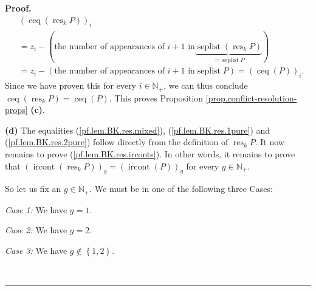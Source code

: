 \documentclass[numbers=enddot,12pt,final,onecolumn,notitlepage]{scrartcl}%
\theoremstyle{definition}
\newenvironment{proof}[1][Proof]{\noindent\textbf{#1.} }{\ \rule{0.5em}{0.5em}}
\begin{document}
\begin{proof}
\begin{align*}
&  \left(  \operatorname*{ceq}\left(  \operatorname*{res}\nolimits_{k}%
P\right)  \right)  _{i}\\
&  =z_{i}-\left(  \text{the number of appearances of }i+1\text{ in
}\underbrace{\operatorname*{seplist}\left(  \operatorname*{res}\nolimits_{k}%
P\right)  }_{=\operatorname*{seplist}P}\right) \\
&  =z_{i}-\left(  \text{the number of appearances of }i+1\text{ in
}\operatorname*{seplist}P\right)  =\left(  \operatorname*{ceq}\left(
P\right)  \right)  _{i}.
\end{align*}
Since we have proven this for every $i\in\mathbb{N}_{+}$, we can thus conclude
$\operatorname*{ceq}\left(  \operatorname*{res}\nolimits_{k}P\right)
=\operatorname*{ceq}\left(  P\right)  $. This proves Proposition
\ref{prop.conflict-resolution-props} \textbf{(c)}.

\textbf{(d)} The equalities (\ref{pf.lem.BK.res.mixed}),
(\ref{pf.lem.BK.res.1pure}) and (\ref{pf.lem.BK.res.2pure}) follow directly
from the definition of $\operatorname*{res}\nolimits_{k}P$. It now remains to
prove (\ref{pf.lem.BK.res.irconts}). In other words, it remains to prove that
$\left(  \operatorname*{ircont}\left(  \operatorname*{res}\nolimits_{k}%
P\right)  \right)  _{g}=\left(  \operatorname*{ircont}\left(  P\right)
\right)  _{g}$ for every $g\in\mathbb{N}_{+}$.

So let us fix an $g\in\mathbb{N}_{+}$. We must be in one of the following
three Cases:

\textit{Case 1:} We have $g=1$.

\textit{Case 2:} We have $g=2$.

\textit{Case 3:} We have $g\notin\left\{  1,2\right\}  $.


\end{proof}
\end{document}

